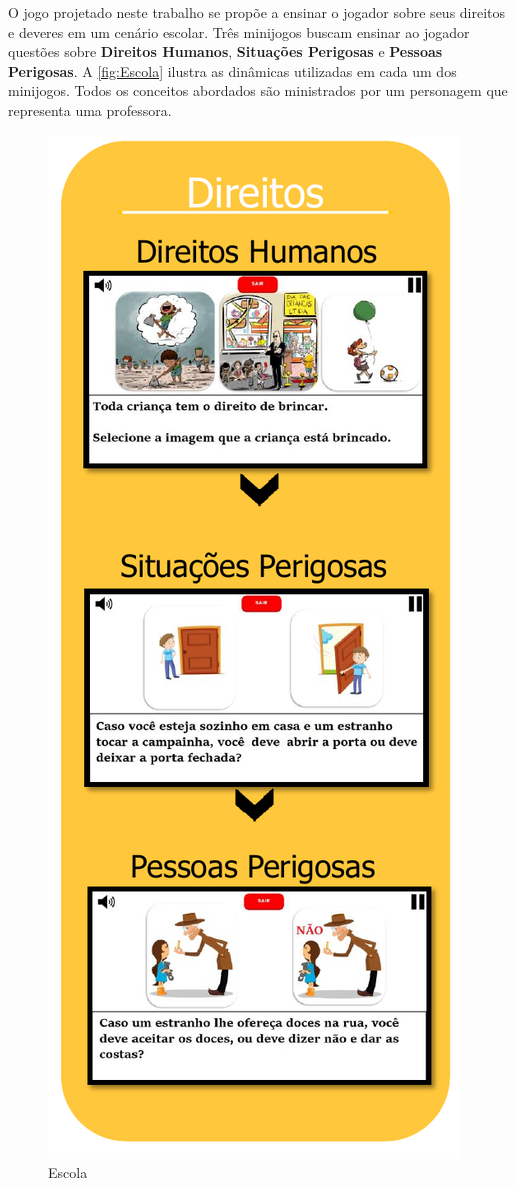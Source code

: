 O jogo projetado neste trabalho se propõe a ensinar o jogador sobre seus direitos e deveres em um cenário escolar. Três minijogos buscam ensinar ao jogador questões sobre \textbf{Direitos Humanos}, \textbf{Situações Perigosas} e \textbf{Pessoas Perigosas}. A \autoref{fig:Escola} ilustra as dinâmicas utilizadas em cada um dos minijogos. Todos os conceitos abordados são ministrados por um personagem que representa uma professora. 

\begin{figure}%
  \vspace{-20pt}
  \caption{\label{fig:Escola}Escola}
  \includegraphics[width=\linewidth]{./Visuais/Escola.pdf}

\end{figure}
